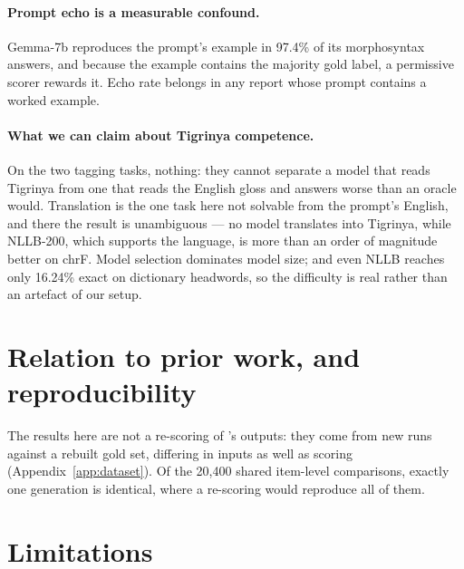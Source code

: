 \documentclass[11pt]{article}
\begin{document}
\paragraph{Prompt echo is a measurable confound.} Gemma-7b reproduces the
prompt's example in 97.4\% of its morphosyntax answers, and because the
example contains the majority gold label, a permissive scorer rewards it.
Echo rate belongs in any report whose prompt contains a worked example.

\paragraph{What we can claim about Tigrinya competence.} On the two tagging
tasks, nothing: they cannot separate a model that reads Tigrinya from one
that reads the English gloss and answers worse than an oracle would.
Translation is the one task here not solvable from the prompt's English, and
there the result is unambiguous --- no model translates into Tigrinya, while
NLLB-200, which supports the language, is more than an order of magnitude
better on chrF. Model selection dominates model size; and even NLLB reaches
only 16.24\% exact on dictionary headwords, so the difficulty is real rather
than an artefact of our setup.

\section{Relation to prior work, and reproducibility}
\label{sec:relation}
\label{sec:reproducibility}

The results here are not a re-scoring of \citeauthor{llmprobe-2026}'s
outputs: they come from new runs against a rebuilt gold set, differing in
inputs as well as scoring (Appendix~\ref{app:dataset}). Of the 20,400 shared
item-level comparisons, exactly one generation is identical, where a
re-scoring would reproduce all of them.

\section{Limitations}
\label{sec:limitations}
\end{document}
